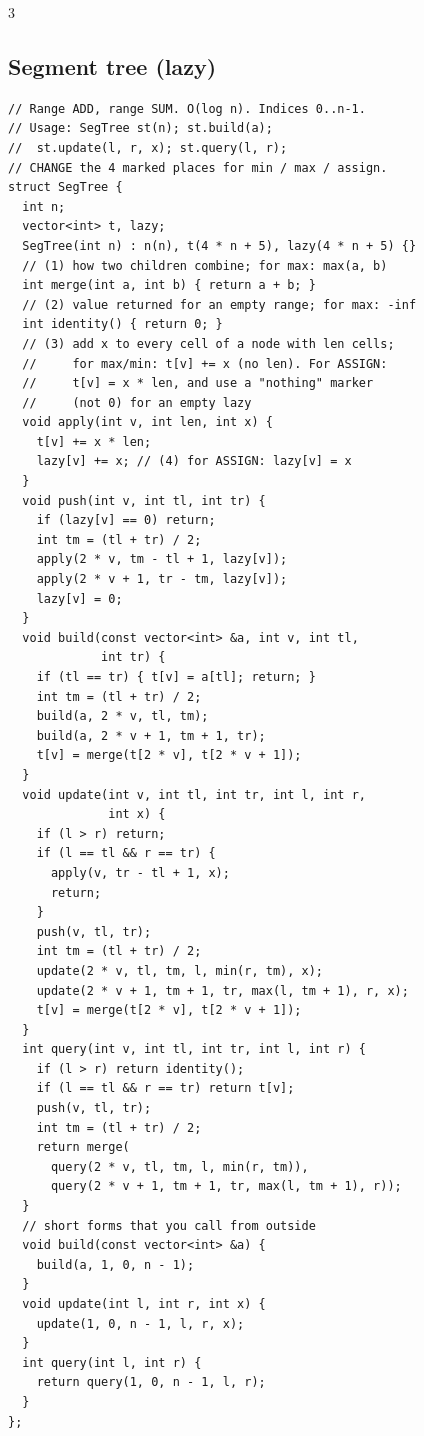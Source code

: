\documentclass[8pt, a4paper]{article}
\begin{document}
\begin{multicols*}{3}
\subsection{Segment tree (lazy)}
\begin{lstlisting}
// Range ADD, range SUM. O(log n). Indices 0..n-1.
// Usage: SegTree st(n); st.build(a);
//  st.update(l, r, x); st.query(l, r);
// CHANGE the 4 marked places for min / max / assign.
struct SegTree {
  int n;
  vector<int> t, lazy;
  SegTree(int n) : n(n), t(4 * n + 5), lazy(4 * n + 5) {}
  // (1) how two children combine; for max: max(a, b)
  int merge(int a, int b) { return a + b; }
  // (2) value returned for an empty range; for max: -inf
  int identity() { return 0; }
  // (3) add x to every cell of a node with len cells;
  //     for max/min: t[v] += x (no len). For ASSIGN:
  //     t[v] = x * len, and use a "nothing" marker
  //     (not 0) for an empty lazy
  void apply(int v, int len, int x) {
    t[v] += x * len;
    lazy[v] += x; // (4) for ASSIGN: lazy[v] = x
  }
  void push(int v, int tl, int tr) {
    if (lazy[v] == 0) return;
    int tm = (tl + tr) / 2;
    apply(2 * v, tm - tl + 1, lazy[v]);
    apply(2 * v + 1, tr - tm, lazy[v]);
    lazy[v] = 0;
  }
  void build(const vector<int> &a, int v, int tl,
             int tr) {
    if (tl == tr) { t[v] = a[tl]; return; }
    int tm = (tl + tr) / 2;
    build(a, 2 * v, tl, tm);
    build(a, 2 * v + 1, tm + 1, tr);
    t[v] = merge(t[2 * v], t[2 * v + 1]);
  }
  void update(int v, int tl, int tr, int l, int r,
              int x) {
    if (l > r) return;
    if (l == tl && r == tr) {
      apply(v, tr - tl + 1, x);
      return;
    }
    push(v, tl, tr);
    int tm = (tl + tr) / 2;
    update(2 * v, tl, tm, l, min(r, tm), x);
    update(2 * v + 1, tm + 1, tr, max(l, tm + 1), r, x);
    t[v] = merge(t[2 * v], t[2 * v + 1]);
  }
  int query(int v, int tl, int tr, int l, int r) {
    if (l > r) return identity();
    if (l == tl && r == tr) return t[v];
    push(v, tl, tr);
    int tm = (tl + tr) / 2;
    return merge(
      query(2 * v, tl, tm, l, min(r, tm)),
      query(2 * v + 1, tm + 1, tr, max(l, tm + 1), r));
  }
  // short forms that you call from outside
  void build(const vector<int> &a) {
    build(a, 1, 0, n - 1);
  }
  void update(int l, int r, int x) {
    update(1, 0, n - 1, l, r, x);
  }
  int query(int l, int r) {
    return query(1, 0, n - 1, l, r);
  }
};
\end{lstlisting}

\end{multicols*}
\end{document}
